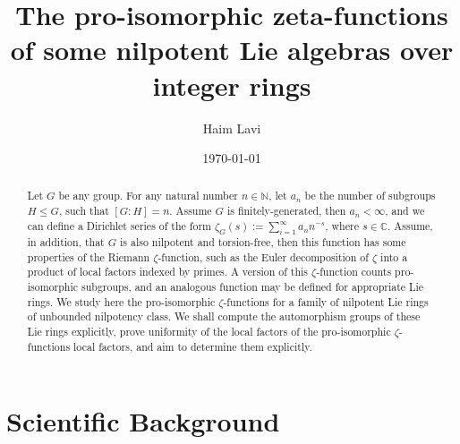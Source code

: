 \documentclass[12pt]{article}
\title{The pro-isomorphic zeta-functions of some nilpotent Lie algebras over integer rings}
\author{Haim Lavi}
\date{\today}
\begin{document}
\maketitle
\begin{abstract}
Let $G$ be any group. For any natural number $n\in\mathbb{N}$, let $a_n$ be the number of subgroups $H\leq G$, such that $[G:H]=n$. Assume $G$ is finitely-generated, then $a_n<\infty$, and we can define a Dirichlet series of the form $\zeta_G(s):=\sum_{i=1}^\infty a_n n^{-s}$, where $s\in\mathbb{C}$. Assume, in addition, that $G$ is also nilpotent and torsion-free, then this function has some properties of the Riemann $\zeta$-function, such as the Euler decomposition of $\zeta$ into a product of local factors indexed by primes. A version of this $\zeta$-function counts pro-isomorphic subgroups, and an analogous function may be defined for appropriate Lie rings. We study here the pro-isomorphic $\zeta$-functions for a family of nilpotent Lie rings of unbounded nilpotency class. We shall compute the automorphism groups of these Lie rings explicitly, prove uniformity of the local factors of the pro-isomorphic $\zeta$-functions local factors, and aim to determine them explicitly.
\end{abstract}
\section{Scientific Background}
\end{document}
